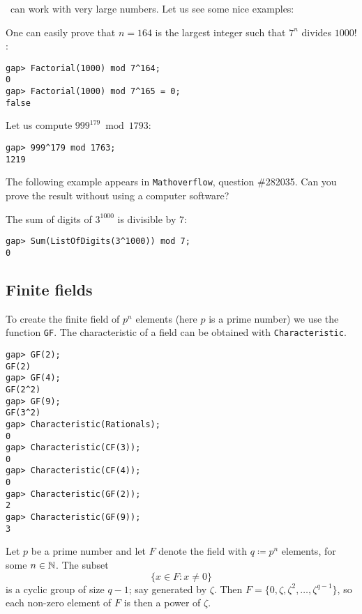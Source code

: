 \GAP~can work with very large numbers. 
Let us see some nice examples:

\begin{example}
	One can easily prove that $n=164$ is the largest integer such that $7^n$
	divides $1000!$:
\begin{lstlisting}
gap> Factorial(1000) mod 7^164;
0
gap> Factorial(1000) mod 7^165 = 0;
false
\end{lstlisting}
\end{example}

\begin{example}
Let us compute $999^{179}\bmod 1793$:
\begin{lstlisting}
gap> 999^179 mod 1763;
1219
\end{lstlisting}
\end{example}

The following example appears in \texttt{Mathoverflow}, question \#282035. Can you prove
the result without using a computer software?

\begin{example}
	The sum of digits of $3^{1000}$ is divisible by $7$: %
\begin{lstlisting}
gap> Sum(ListOfDigits(3^1000)) mod 7;
0
\end{lstlisting}
\end{example}


\subsection*{Finite fields}
To create the finite field of $p^n$
elements (here $p$ is a prime number) we use the function \lstinline{GF}.  The
characteristic of a field can be obtained with \lstinline{Characteristic}. 
\begin{lstlisting}
gap> GF(2);                                                           
GF(2)
gap> GF(4);
GF(2^2)
gap> GF(9);
GF(3^2)
gap> Characteristic(Rationals);
0
gap> Characteristic(CF(3));
0
gap> Characteristic(CF(4));
0
gap> Characteristic(GF(2));
2
gap> Characteristic(GF(9));
3
\end{lstlisting}

Let $p$ be a prime number and let $F$ denote the field with $q\coloneqq p^n$ elements, for some $n\in\mathbb{N}$. 
The subset 
\[
  \{x\in F:x\ne 0\}
\]
is a cyclic group of size $q-1$; say generated by $\zeta$. Then
$F=\{0,\zeta,\zeta^2,\dots,\zeta^{q-1}\}$, so each non-zero element of $F$ is
then a power of $\zeta$.  

